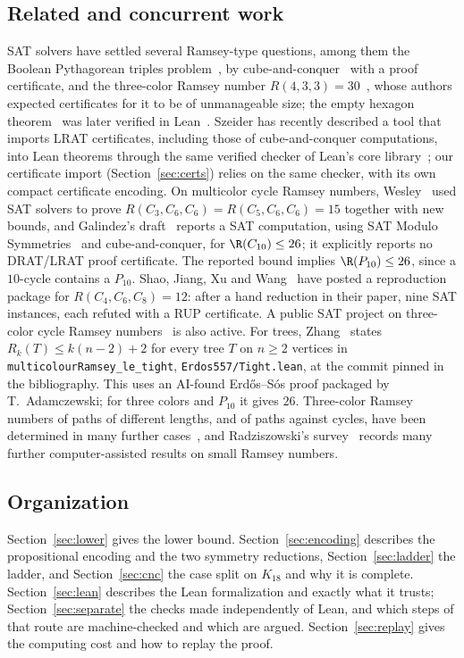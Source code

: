 \subsection{Related and concurrent work}\label{sec:related}
SAT solvers have settled several Ramsey-type questions, among them the
Boolean Pythagorean triples problem~\cite{HKM16}, by
cube-and-conquer~\cite{HKWB12} with a proof certificate, and the
three-color Ramsey number $R(4,3,3)=30$~\cite{CFIM16}, whose authors
expected certificates for it to be of unmanageable size; the empty hexagon
theorem~\cite{HS24} was later verified in Lean~\cite{SNG+24}. Szeider has
recently described a tool that imports LRAT certificates, including those
of cube-and-conquer computations, into Lean theorems through the same
verified checker of Lean's core library~\cite{Sze26}; our certificate
import (Section~\ref{sec:certs}) relies on the same checker, with its own
compact certificate encoding. On multicolor cycle
Ramsey numbers, Wesley~\cite{Wes25} used SAT solvers to prove
$R(C_3,C_6,C_6)=R(C_5,C_6,C_6)=15$ together with new bounds, and
Galindez's draft~\cite[Theorem~1]{Gal26} reports a SAT computation, using SAT
Modulo Symmetries~\cite{KS24} and cube-and-conquer, for
$\R(C_{10})\le 26$; it explicitly reports no DRAT/LRAT proof certificate.
The reported bound implies $\R(P_{10})\le 26$, since a
$10$-cycle contains a $P_{10}$. Shao, Jiang, Xu and Wang~\cite{SJXW26}
have posted a reproduction package for $R(C_4,C_6,C_8)=12$: after a hand
reduction in their paper, nine SAT instances, each refuted with a RUP
certificate. A public SAT project on three-color cycle
Ramsey numbers~\cite{Zha26} is also active. For trees, Zhang~\cite{ZhJ26}
states $R_k(T)\le k(n-2)+2$ for every tree $T$ on
$n\ge2$ vertices in \texttt{multicolourRamsey\_le\_tight},
\texttt{Erdos557/Tight.lean}, at the commit pinned in the bibliography.
This uses an AI-found Erdős--Sós proof packaged by T.~Adamczewski; for three colors and $P_{10}$
it gives $26$. Three-color Ramsey numbers of
paths of different lengths, and of paths against cycles, have been
determined in many further cases~\cite{Dzi05,DF09,OR11,MORS15}, and
Radziszowski's survey~\cite{Rad26} records many further computer-assisted
results on small Ramsey numbers.

\subsection{Organization}
Section~\ref{sec:lower} gives the lower bound. Section~\ref{sec:encoding}
describes the propositional encoding and the two symmetry reductions,
Section~\ref{sec:ladder} the ladder, and Section~\ref{sec:cnc} the case
split on $K_{18}$ and why it is complete. Section~\ref{sec:lean} describes
the Lean formalization and exactly what it trusts;
Section~\ref{sec:separate} the checks made independently of Lean, and
which steps of that route are machine-checked and which are argued.
Section~\ref{sec:replay} gives the computing cost and how to replay the
proof.

